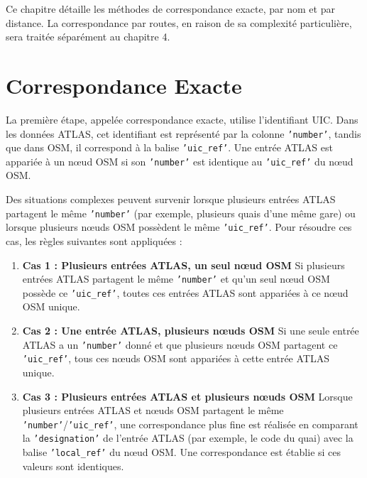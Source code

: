 Ce chapitre détaille les méthodes de correspondance exacte, par nom et par distance. La correspondance par routes, en raison de sa complexité particulière, sera traitée séparément au chapitre 4.


\section{Correspondance Exacte}

La première étape, appelée correspondance exacte, utilise l’identifiant UIC. Dans les données ATLAS, cet identifiant est représenté par la colonne \texttt{'number'}, tandis que dans OSM, il correspond à la balise \texttt{'uic\_ref'}. Une entrée ATLAS est appariée à un nœud OSM si son \texttt{'number'} est identique au \texttt{'uic\_ref'} du nœud OSM.

Des situations complexes peuvent survenir lorsque plusieurs entrées ATLAS partagent le même \texttt{'number'} (par exemple, plusieurs quais d’une même gare) ou lorsque plusieurs nœuds OSM possèdent le même \texttt{'uic\_ref'}. Pour résoudre ces cas, les règles suivantes sont appliquées :

\begin{enumerate}
    \item \textbf{Cas 1 : Plusieurs entrées ATLAS, un seul nœud OSM}  
    Si plusieurs entrées ATLAS partagent le même \texttt{'number'} et qu’un seul nœud OSM possède ce \texttt{'uic\_ref'}, toutes ces entrées ATLAS sont appariées à ce nœud OSM unique.

    \item \textbf{Cas 2 : Une entrée ATLAS, plusieurs nœuds OSM}  
    Si une seule entrée ATLAS a un \texttt{'number'} donné et que plusieurs nœuds OSM partagent ce \texttt{'uic\_ref'}, tous ces nœuds OSM sont appariées à cette entrée ATLAS unique.

    \item \textbf{Cas 3 : Plusieurs entrées ATLAS et plusieurs nœuds OSM}  
    Lorsque plusieurs entrées ATLAS et nœuds OSM partagent le même \texttt{'number'}/\texttt{'uic\_ref'}, une correspondance plus fine est réalisée en comparant la \texttt{'designation'} de l’entrée ATLAS (par exemple, le code du quai) avec la balise \texttt{'local\_ref'} du nœud OSM. Une correspondance est établie si ces valeurs sont identiques.
\end{enumerate}

